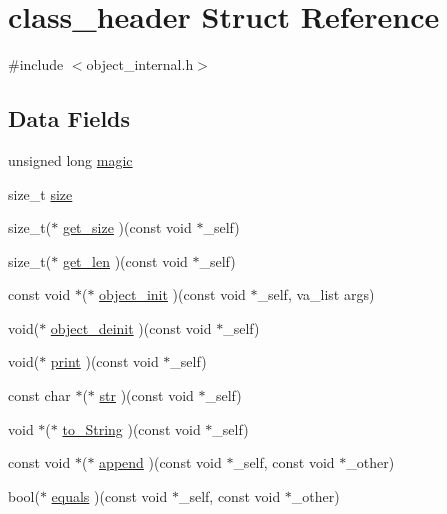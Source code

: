 \hypertarget{structclass__header}{}\section{class\+\_\+header Struct Reference}
\label{structclass__header}


{\ttfamily \#include $<$object\+\_\+internal.\+h$>$}

\subsection*{Data Fields}
\begin{DoxyCompactItemize}
\item 
unsigned long \mbox{\hyperlink{structclass__header_aa98964036010ad63554856c5f4680cec}{magic}}
\item 
size\+\_\+t \mbox{\hyperlink{structclass__header_a5ba6bf54fc12a2a31a2b39937cd50e84}{size}}
\item 
size\+\_\+t($\ast$ \mbox{\hyperlink{structclass__header_a5c135b5316d0d9d22dce1f32fb8befb1}{get\+\_\+size}} )(const void $\ast$\+\_\+self)
\item 
size\+\_\+t($\ast$ \mbox{\hyperlink{structclass__header_a1b7cb949741b9a64fd3569af94f30cba}{get\+\_\+len}} )(const void $\ast$\+\_\+self)
\item 
const void $\ast$($\ast$ \mbox{\hyperlink{structclass__header_a560f3c418eb904136bfcb91d3618430c}{object\+\_\+init}} )(const void $\ast$\+\_\+self, va\+\_\+list args)
\item 
void($\ast$ \mbox{\hyperlink{structclass__header_aa07a11a17f5d79a66c9086b8d10969b7}{object\+\_\+deinit}} )(const void $\ast$\+\_\+self)
\item 
void($\ast$ \mbox{\hyperlink{structclass__header_a23181c1eac1455a8f23dd9d14f8b6abd}{print}} )(const void $\ast$\+\_\+self)
\item 
const char $\ast$($\ast$ \mbox{\hyperlink{structclass__header_af8a0a6de1e1eb96faab68cc58fcf84d0}{str}} )(const void $\ast$\+\_\+self)
\item 
void $\ast$($\ast$ \mbox{\hyperlink{structclass__header_a67a4f888ffa78b4905bc3585fe1f17a4}{to\+\_\+\+String}} )(const void $\ast$\+\_\+self)
\item 
const void $\ast$($\ast$ \mbox{\hyperlink{structclass__header_a10e4c230bf810df38e3581caabad02bb}{append}} )(const void $\ast$\+\_\+self, const void $\ast$\+\_\+other)
\item 
bool($\ast$ \mbox{\hyperlink{structclass__header_a01dc6aae9011475ec7be8500d4f63c5b}{equals}} )(const void $\ast$\+\_\+self, const void $\ast$\+\_\+other)

\end{DoxyCompactItemize}
